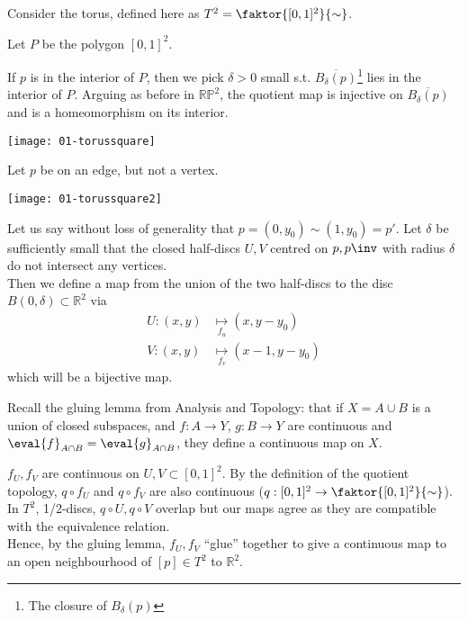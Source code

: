 \begin{example}
	Consider the torus, defined here as $T^2 = \faktor{[0,1]^2}{\sim}$.
	\begin{center}
	\end{center}
	Let $P$ be the polygon $[0,1]^2$.

	If $p$ is in the interior of $P$, then we pick $\delta > 0$ small s.t. $\overline{B_{\delta}(p)}$\footnote{The closure of $B_\delta(p)$} lies in the interior of $P$.
	Arguing as before in $\mathbb{R} \mathbb{P}^2$, the quotient map is injective on $\overline{B_{\delta}(p)}$ and is a homeomorphism on its interior.
	{ 	\par
		\centering 
		\texttt{[image: 01-torussquare]} 
		\par
	}

	Let $p$ be on an edge, but not a vertex.
	{ 	\par
		\centering 
		\texttt{[image: 01-torussquare2]} 
		\par
	}
	Let us say without loss of generality that $p = (0,y_0) \sim (1,y_0) = p'$.
	Let $\delta$ be sufficiently small that the closed half-discs $U, V$ centred on $p, p\inv$ with radius $\delta$ do not intersect any vertices. \\
	Then we define a map from the union of the two half-discs to the disc $B(0,\delta) \subset \mathbb R^2$ via 
	\begin{align*}
		U : (x,y) &\underset{f_u}{\mapsto} (x,y-y_0) \\
		V : (x,y) &\underset{f_v}{\mapsto} (x-1,y-y_0)
	\end{align*} which will be a bijective map.

	Recall the gluing lemma from Analysis and Topology: that if $X = A \cup B$ is a union of closed subspaces, and $f : A \to Y$, $g : B \to Y$ are continuous and $\eval{f}_{A \cap B} = \eval{g}_{A \cap B}$, they define a continuous map on $X$.

	$f_U, f_V$ are continuous on $U, V \subset [0, 1]^2$.
	By the definition of the quotient topology, $q \circ f_U$ and $q \circ f_V$ are also continuous ($q: [0, 1]^2 \to \faktor{[0, 1]^2}{\sim}$). \\
	In $T^2$, 1/2-discs, $q \circ U, q \circ V$ overlap but our maps agree as they are compatible with the equivalence relation. \\
	Hence, by the gluing lemma, $f_U, f_V$ ``glue'' together to give a continuous map to an open neighbourhood of $[p] \in T^2$ to $\mathbb{R}^2$.


\end{example}
